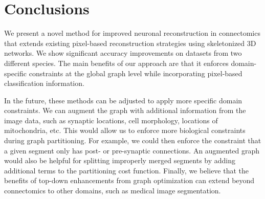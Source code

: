 \section{Conclusions}

We present a novel method for improved neuronal reconstruction in connectomics that extends existing pixel-based reconstruction strategies using skeletonized 3D networks. 
We show significant accuracy improvements on datasets from two different species. 
The main benefits of our approach are that it enforces domain-specific constraints at the global graph level while incorporating pixel-based classification information.

In the future, these methods can be adjusted to apply more specific domain constraints. 
We can augment the graph with additional information from the image data, such as synaptic locations, cell morphology, locations of mitochondria, etc. 
This would allow us to enforce more biological constraints during graph partitioning. 
For example, we could then enforce the constraint that a given segment only has post- or pre-synaptic connections. 
An augmented graph would also be helpful for splitting improperly merged segments by adding additional terms to the partitioning cost function. 
Finally, we believe that the benefits of top-down enhancements from graph optimization can extend beyond connectomics to other domains, such as medical image segmentation.